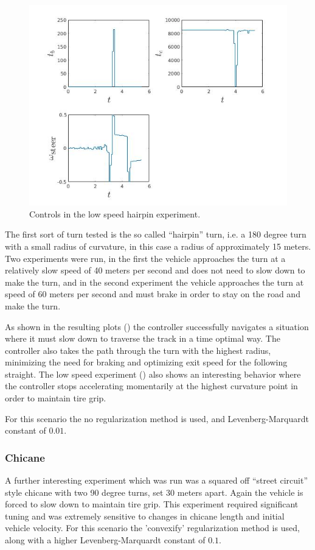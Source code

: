 \documentclass[conference,11pt]{IEEEtran}
\begin{document}
\begin{figure}[t]
  \centering
  \includegraphics[scale=0.5]{hairpin_lift_u.jpg}
  \caption{Controls in the low speed hairpin experiment.}
  \label{fig:hpu1}
\end{figure}

The first sort of turn tested is the so called ``hairpin'' turn, i.e. a 180 degree turn with a small radius of curvature, in this case a radius of approximately 15 meters. Two experiments were run,
in the first the vehicle approaches the turn at a relatively slow speed of 40 meters per second and does not need to slow down to make the turn, and in the second experiment the vehicle approaches
the turn at speed of 60 meters per second and must brake in order to stay on the road and make the turn.

As shown in the resulting plots () the controller successfully navigates a situation where it must slow down to traverse the track in a time optimal way.
The controller also takes the path through the turn with the highest radius, minimizing the need for braking and optimizing exit speed for the following straight. The low speed experiment
() also shows an interesting behavior where the controller stops accelerating momentarily at the highest curvature point in order to maintain tire grip.

For this scenario the no regularization method is used, and Levenberg-Marquardt constant of $0.01$.

\subsubsection{Chicane}
A further interesting experiment which was run was a squared off ``street circuit'' style chicane with two 90 degree turns, set 30 meters apart. Again the vehicle is forced to slow down to
maintain tire grip. This experiment required significant tuning and was extremely sensitive to changes in chicane length and initial vehicle velocity. For this scenario the 'convexify' regularization
method is used, along with a higher Levenberg-Marquardt constant of $0.1$.
\end{document}
